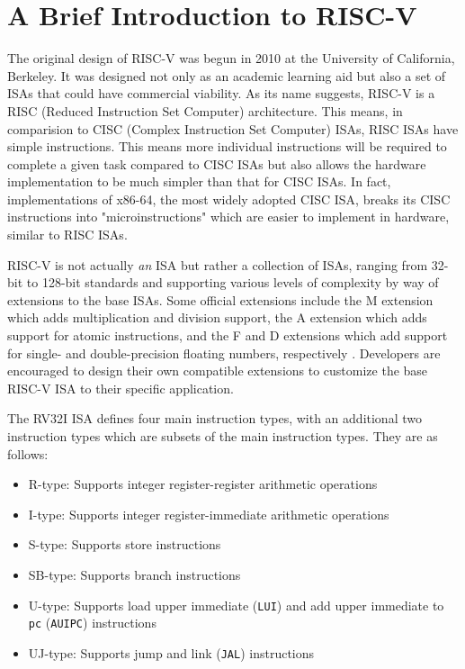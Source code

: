 \documentclass[lettersize,journal]{IEEEtran}
\begin{document}
\section{A Brief Introduction to RISC-V}
The original design of RISC-V was begun in 2010 at the University of California, Berkeley. 
It was designed not only as an academic learning aid but also a set of ISAs that could have commercial viability. 
As its name suggests, RISC-V is a RISC (Reduced Instruction Set Computer) architecture. 
This means, in comparision to CISC (Complex Instruction Set Computer) ISAs, RISC ISAs have simple instructions. 
This means more individual instructions will be required to complete a given task compared to CISC ISAs but also allows the 
hardware implementation to be much simpler than that for CISC ISAs. In fact, implementations of x86-64, the most widely adopted CISC ISA, 
breaks its CISC instructions into "microinstructions" which are easier to implement in hardware, similar to RISC ISAs.

RISC-V is not actually \textit{an} ISA but rather a collection of ISAs, 
ranging from 32-bit to 128-bit standards and supporting various levels of complexity by way of extensions to the base ISAs. 
Some official extensions include the M extension which adds multiplication and division support, 
the A extension which adds support for atomic instructions, and the F and D extensions which add support for single- and double-precision floating numbers, 
respectively \cite{riscvunprovisioned}. Developers are encouraged to design their own compatible extensions to customize the base RISC-V ISA to their specific application.

The RV32I ISA defines four main instruction types, with an additional two instruction types which are subsets of the main instruction types. They are as follows:
\begin{itemize}
  \item R-type: Supports integer register-register arithmetic operations
  \item I-type: Supports integer register-immediate arithmetic operations
  \item S-type: Supports store instructions
  \item SB-type: Supports branch instructions
  \item U-type: Supports load upper immediate (\verb|LUI|) and add upper immediate to \verb|pc| (\verb|AUIPC|) instructions
  \item UJ-type: Supports jump and link (\verb|JAL|) instructions
\end{itemize}
\end{document}
